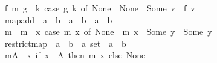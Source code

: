 \begin{isabellebody}
\ \ {\isachardoublequoteopen}f\ {\isasymcirc}\isactrlsub m\ g\ {\isacharequal}{\kern0pt}\ {\isacharparenleft}{\kern0pt}{\isasymlambda}k{\isachardot}{\kern0pt}\ case\ g\ k\ of\ None\ {\isasymRightarrow}\ None\ {\isacharbar}{\kern0pt}\ Some\ v\ {\isasymRightarrow}\ f\ v{\isacharparenright}{\kern0pt}{\isachardoublequoteclose}\isanewline
\isanewline
{}\isamarkupfalse%
\isanewline
\ \ map{\isacharunderscore}{\kern0pt}add\ {\isacharcolon}{\kern0pt}{\isacharcolon}{\kern0pt}\ {\isachardoublequoteopen}{\isacharparenleft}{\kern0pt}{\isacharprime}{\kern0pt}a\ {\isasymrightharpoonup}\ {\isacharprime}{\kern0pt}b{\isacharparenright}{\kern0pt}\ {\isasymRightarrow}\ {\isacharparenleft}{\kern0pt}{\isacharprime}{\kern0pt}a\ {\isasymrightharpoonup}\ {\isacharprime}{\kern0pt}b{\isacharparenright}{\kern0pt}\ {\isasymRightarrow}\ {\isacharparenleft}{\kern0pt}{\isacharprime}{\kern0pt}a\ {\isasymrightharpoonup}\ {\isacharprime}{\kern0pt}b{\isacharparenright}{\kern0pt}{\isachardoublequoteclose}\ \ {\isacharparenleft}{\kern0pt}\ {\isachardoublequoteopen}{\isacharplus}{\kern0pt}{\isacharplus}{\kern0pt}{\isachardoublequoteclose}\ {}{}{}{\isacharparenright}{\kern0pt}\ \isanewline
\ \ {\isachardoublequoteopen}m{}\ {\isacharplus}{\kern0pt}{\isacharplus}{\kern0pt}\ m{}\ {\isacharequal}{\kern0pt}\ {\isacharparenleft}{\kern0pt}{\isasymlambda}x{\isachardot}{\kern0pt}\ case\ m{}\ x\ of\ None\ {\isasymRightarrow}\ m{}\ x\ {\isacharbar}{\kern0pt}\ Some\ y\ {\isasymRightarrow}\ Some\ y{\isacharparenright}{\kern0pt}{\isachardoublequoteclose}\isanewline
\isanewline
{}\isamarkupfalse%
\isanewline
\ \ restrict{\isacharunderscore}{\kern0pt}map\ {\isacharcolon}{\kern0pt}{\isacharcolon}{\kern0pt}\ {\isachardoublequoteopen}{\isacharparenleft}{\kern0pt}{\isacharprime}{\kern0pt}a\ {\isasymrightharpoonup}\ {\isacharprime}{\kern0pt}b{\isacharparenright}{\kern0pt}\ {\isasymRightarrow}\ {\isacharprime}{\kern0pt}a\ set\ {\isasymRightarrow}\ {\isacharparenleft}{\kern0pt}{\isacharprime}{\kern0pt}a\ {\isasymrightharpoonup}\ {\isacharprime}{\kern0pt}b{\isacharparenright}{\kern0pt}{\isachardoublequoteclose}\ \ {\isacharparenleft}{\kern0pt}\ {\isachardoublequoteopen}{\isacharbar}{\kern0pt}{\isacharbackquote}{\kern0pt}{\isachardoublequoteclose}\ \ {}{}{}{\isacharparenright}{\kern0pt}\ \isanewline
\ \ {\isachardoublequoteopen}m{\isacharbar}{\kern0pt}{\isacharbackquote}{\kern0pt}A\ {\isacharequal}{\kern0pt}\ {\isacharparenleft}{\kern0pt}{\isasymlambda}x{\isachardot}{\kern0pt}\ if\ x\ {\isasymin}\ A\ then\ m\ x\ else\ None{\isacharparenright}{\kern0pt}{\isachardoublequoteclose}\isanewline

\end{isabellebody}
